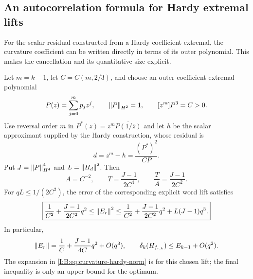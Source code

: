 

\subsection{An autocorrelation formula for Hardy extremal lifts}

For the scalar residual constructed from a Hardy coefficient extremal,
the curvature coefficient can be written directly in terms of its outer
polynomial. This makes the cancellation and its quantitative size
explicit.

\begin{corollary}
\label{I:B:cor:hardy-curvature}
Let $m=k-1$, let $C=C(m,2/3)$, and choose an outer coefficient-extremal
polynomial
\[
 P(z)=\sum_{j=0}^{m}p_jz^j,\qquad
 \left\lVert P\right\rVert_{H^2}=1,\qquad [z^m]P^3=C>0.
\]
Use reversal order $m$ in
$P^*(z)=z^m\overline{P(1/\overline z)}$ and let $h$ be the scalar
approximant supplied by the Hardy construction, whose residual is
\begin{equation}
 d=z^m-h=\frac{(P^*)^2}{CP}.
 \label{I:B:eq:curvature-hardy-residual}
\end{equation}
Put $J=\left\lVert P\right\rVert_{H^4}^4$ and $L=\left\lVert H_d\right\rVert^2$. Then
\begin{equation}
 A=C^{-2},\qquad
 T=\frac{J-1}{2C^4},\qquad
 \frac TA=\frac{J-1}{2C^2}.
 \label{I:B:eq:curvature-hardy-coefficients}
\end{equation}
For $qL\le1/(2C^2)$, the error of the corresponding explicit word lift
satisfies
\begin{equation}
 \boxed{\displaystyle
 \frac1{C^2}+\frac{J-1}{2C^2}q^2
 \le\left\lVert E_r\right\rVert^2
 \le\frac1{C^2}+\frac{J-1}{2C^2}q^2
           +L(J-1)q^3.}
 \label{I:B:eq:curvature-hardy-finite}
\end{equation}
In particular,
\begin{equation}
 \left\lVert E_r\right\rVert=\frac1C+\frac{J-1}{4C}q^2+O(q^3),
 \qquad
 \delta_k(H_{f_{r,k}})\le E_{k-1}+O(q^2).
 \label{I:B:eq:curvature-hardy-norm}
\end{equation}
The expansion in \eqref{I:B:eq:curvature-hardy-norm} is for this chosen
lift; the final inequality is only an upper bound for the optimum.
\end{corollary}



